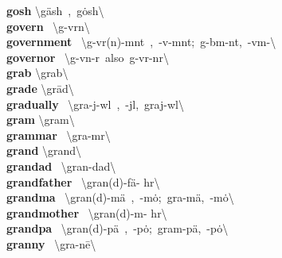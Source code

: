 \documentclass[10pt,a4paper]{article}
\begin{document}
\begin{multicols}{2}
\textbf{ gosh }\quad \textbackslash \textprimstress g\"{a}sh\ ,\ \textprimstress g\.{o}sh\textbackslash \\
\textbf{ govern }\quad \ \textbackslash \textprimstress g\textschwa -v\textschwa rn\textbackslash \\
\textbf{ government }\quad \ \textbackslash \textprimstress g\textschwa -v\textschwa r(n)-m\textschwa nt\ ,\ -v\textschwa -m\textschwa nt;\ \textprimstress g\textschwa -b\textsuperscript{\textreve}m-\textschwa nt,\ -v\textsuperscript{\textreve}m-\textbackslash \\
\textbf{ governor }\quad \ \textbackslash \textprimstress g\textschwa -v\textsuperscript{\textreve}n-\textschwa r\ also\ \textprimstress g\textschwa -v\textschwa r-n\textschwa r\textbackslash \\
\textbf{ grab }\quad \textbackslash \textprimstress grab\textbackslash \\
\textbf{ grade }\quad \textbackslash \textprimstress gr\={a}d\textbackslash \\
\textbf{ gradually }\quad \ \textbackslash \textprimstress gra-j\textschwa -w\textschwa l\ ,\ -j\textschwa l,\ \textprimstress graj-w\textschwa l\textbackslash \\
\textbf{ gram }\quad \textbackslash \textprimstress gram\textbackslash \\
\textbf{ grammar }\quad \ \textbackslash \textprimstress gra-m\textschwa r\textbackslash \\
\textbf{ grand }\quad \textbackslash \textprimstress grand\textbackslash \\
\textbf{ grandad }\quad \ \textbackslash \textprimstress gran-\textsecstress dad\textbackslash \\
\textbf{ grandfather }\quad \ \textbackslash \textprimstress gran(d)-\textsecstress f\"{a}- h\textschwa r\textbackslash \\
\textbf{ grandma }\quad \ \textbackslash \textprimstress gran(d)-\textsecstress m\"{a}\ ,\ -\textsecstress m\.{o};\ \textprimstress gra-\textsecstress m\"{a},\ -\textsecstress m\.{o}\textbackslash \\
\textbf{ grandmother }\quad \ \textbackslash \textprimstress gran(d)-\textsecstress m\textschwa - h\textschwa r\textbackslash \\
\textbf{ grandpa }\quad \ \textbackslash \textprimstress gran(d)-\textsecstress p\"{a}\ ,\ -\textsecstress p\.{o};\ \textprimstress gram-\textsecstress p\"{a},\ -\textsecstress p\.{o}\textbackslash \\
\textbf{ granny }\quad \ \textbackslash \textprimstress gra-n\={e}\textbackslash \\

\end{multicols}
\end{document}
